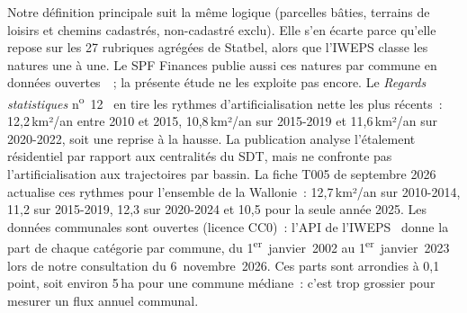 \documentclass[11pt,a4paper]{report}
\newcommand{\kmdan}{\,km²/an}
\begin{document}
Notre définition principale suit la même logique (parcelles bâties, terrains de loisirs et chemins cadastrés, non-cadastré exclu). Elle s'en écarte parce qu'elle repose sur les 27 rubriques agrégées de Statbel, alors que l'IWEPS classe les natures une à une. Le SPF Finances publie aussi ces natures par commune en données ouvertes~\citep{spf_occ}~; la présente étude ne les exploite pas encore. Le \emph{Regards statistiques} n\textsuperscript{o}~12~\citep{iweps_rs12} en tire les rythmes d'artificialisation nette les plus récents~: 12,2\kmdan{} entre 2010 et 2015, 10,8\kmdan{} sur 2015-2019 et 11,6\kmdan{} sur 2020-2022, soit une reprise à la hausse. La publication analyse l'étalement résidentiel par rapport aux centralités du SDT, mais ne confronte pas l'artificialisation aux trajectoires par bassin. La fiche T005 de septembre 2026~\citep{iweps_t005} actualise ces rythmes pour l'ensemble de la Wallonie~: 12,7\kmdan{} sur 2010-2014, 11,2 sur 2015-2019, 12,3 sur 2020-2024 et 10,5 pour la seule année 2025. Les données communales sont ouvertes (licence CC0)~: l'API de l'IWEPS~\citep{iweps_api} donne la part de chaque catégorie par commune, du 1\textsuperscript{er}~janvier~2002 au 1\textsuperscript{er}~janvier~2023 lors de notre consultation du 6~novembre~2026. Ces parts sont arrondies à 0,1\,point, soit environ 5\,ha pour une commune médiane~: c'est trop grossier pour mesurer un flux annuel communal.
\end{document}
